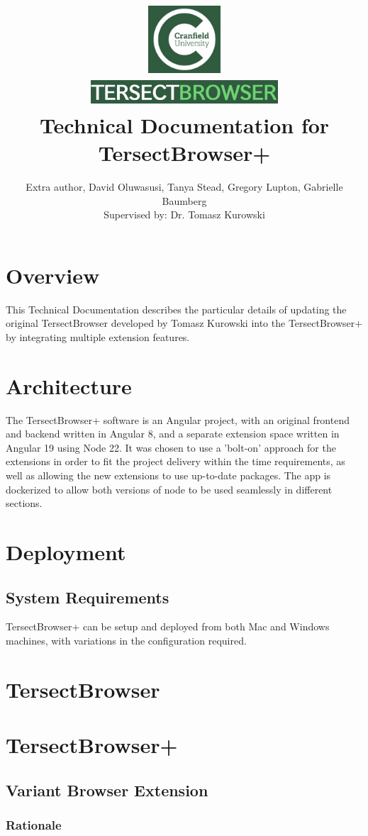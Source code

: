 \documentclass[12pt]{article}
\title{
{\includegraphics[width=3cm, height=2.5cm]{TechDoc/Cran.jpg}}
\\
\includegraphics[width=7cm, height=1cm]{TechDoc/TB.jpg}
\\
{Technical Documentation for TersectBrowser+}
}
\author{Extra author, David Oluwasusi, Tanya Stead, Gregory Lupton, Gabrielle Baumberg \\ Supervised by: Dr. Tomasz Kurowski}
\begin{document}
\sloppy %

\maketitle

\section{Overview}
This Technical Documentation describes the particular details of updating the original TersectBrowser developed by Tomasz Kurowski into the TersectBrowser+ by integrating multiple extension features.
\section{Architecture}
The TersectBrowser+ software is an Angular project, with an original frontend and backend written in Angular 8, and a separate extension space written in Angular 19 using Node 22. It was chosen to use a 'bolt-on' approach for the extensions in order to fit the project delivery within the time requirements, as well as allowing the new extensions to use up-to-date packages. The app is dockerized to allow both versions of node to be used seamlessly in different sections.

\section{Deployment}

\subsection{System Requirements}
TersectBrowser+ can be setup and deployed from both Mac and Windows machines, with variations in the configuration required. 


\section{TersectBrowser}
\section{TersectBrowser+}
\subsection{Variant Browser Extension}
\label{sec:Browser}
\subsubsection{Rationale}
\end{document}
